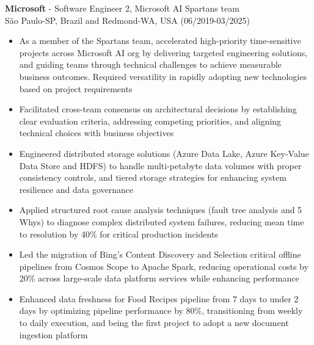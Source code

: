 
\normalsize{\textbf{Microsoft} - Software Engineer 2, Microsoft AI Spartans team}\\
    \footnotesize{São Paulo-SP, Brazil and Redmond-WA, USA (06/2019-03/2025)}

\begin{itemize}
    \item \small{As a member of the Spartans team, accelerated high-priority time-sensitive
        projects across Microsoft AI org by delivering targeted engineering solutions, and guiding teams
        through technical challenges to achieve measurable business outcomes. Required versatility 
        in rapidly adopting new technologies based on project requirements}

    \item \small{Facilitated cross-team consensus on architectural decisions by establishing clear 
        evaluation criteria, addressing competing priorities, and aligning technical choices with 
        business objectives}

    \item \small{Engineered distributed storage solutions (Azure Data Lake, Azure Key-Value Data Store 
        and HDFS) to handle multi-petabyte data volumes with proper consistency controls, and tiered
        storage strategies for enhancing system resilience and data governance}

    \item \small{Applied structured root cause analysis techniques (fault tree analysis and 5
        Whys) to diagnose complex distributed system failures, reducing mean time to resolution by 40\%
        for critical production incidents}

    \item \small{Led the migration of Bing's Content Discovery and Selection critical offline
        pipelines from Cosmos Scope to Apache Spark, reducing operational costs by 20\% across
        large-scale data platform services while enhancing performance}

    \item \small{Enhanced data freshness for Food Recipes pipeline from 7 days to under 2 days by
        optimizing pipeline performance by 80\%, transitioning from weekly to daily execution, and being 
        the first project to adopt a new document ingestion platform}


\end{itemize}
